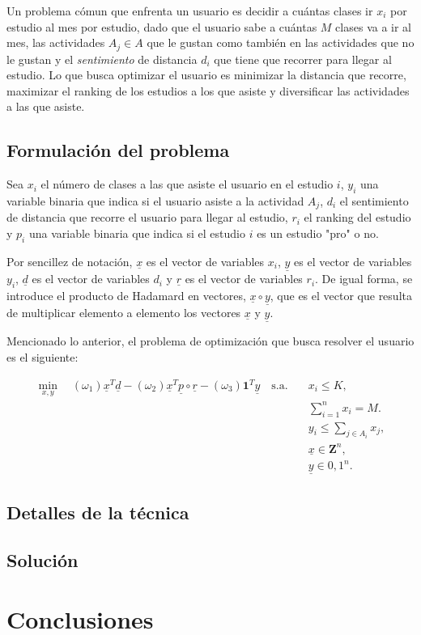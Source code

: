 Un problema cómun que enfrenta un usuario es decidir a cuántas clases ir $x_{i}$ por estudio al mes por estudio, dado que el usuario sabe a cuántas $M$ clases va a ir al mes, las actividades $A_{j} \in A$ que le gustan como también en las actividades que no le gustan y el \textit{sentimiento} de distancia $d_{i}$ que tiene que recorrer para llegar al estudio. Lo que busca optimizar el usuario es minimizar la distancia que recorre, maximizar el ranking de los estudios a los que asiste y diversificar las actividades a las que asiste.

\subsection{Formulación del problema}

Sea $x_{i}$ el número de clases a las que asiste el usuario en el estudio $i$, $y_{i}$ una variable binaria que indica si el usuario asiste a la actividad $A_{j}$, $d_{i}$ el sentimiento de distancia que recorre el usuario para llegar al estudio, $r_{i}$ el ranking del estudio y $p_{i}$ una variable binaria que indica si el estudio $i$ es un estudio "pro" o no. 

Por sencillez de notación, $\underline{x}$ es el vector de variables $x_{i}$, $\underline{y}$ es el vector de variables $y_{i}$, $\underline{d}$ es el vector de variables $d_{i}$ y $\underline{r}$ es el vector de variables $r_{i}$. De igual forma, se introduce el producto de Hadamard en vectores, $\underline{x} \circ \underline{y}$, que es el vector que resulta de multiplicar elemento a elemento los vectores $\underline{x}$ y $\underline{y}$. 

Mencionado lo anterior, el problema de optimización que busca resolver el usuario es el siguiente:

\begin{equation*}
  \begin{aligned}
  \min_{x,y} \quad (\omega_1) \underline{x}^T \underline{d} - 
  (\omega_2) \underline{x}^T\underline{p}\circ \underline{r} - (\omega_3) \mathbf{1}^{T} \underline{y} \quad
  \textrm{s.a.} \quad & 
  x_i \leq K, \\
    & \sum_{i = 1}^{n}{x_i} = M.   \\
    & y_i \leq \sum_{j \in A_i} x_j, \\
    & \underline{x} \in \mathbf{Z}^n , \\
    & \underline{y} \in {0, 1}^{n}.
  \end{aligned}
  \end{equation*}

\subsection{Detalles de la técnica}


\subsection{Solución}

\section{Conclusiones}





